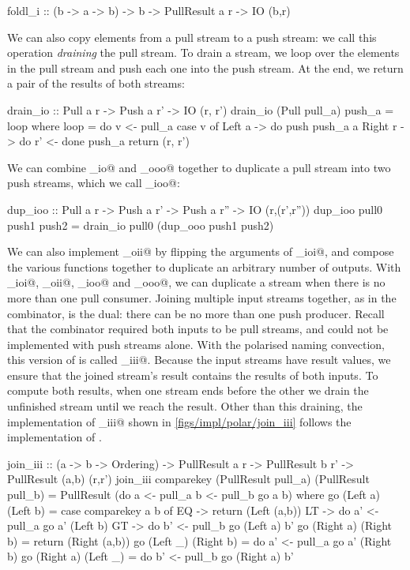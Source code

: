 \begin{haskell}
foldl_i :: (b -> a -> b) -> b -> PullResult a r -> IO (b,r)
\end{haskell}

We can also copy elements from a pull stream to a push stream: we call this operation \emph{draining} the pull stream.
To drain a stream, we loop over the elements in the pull stream and push each one into the push stream.
At the end, we return a pair of the results of both streams:

\begin{haskell}
drain_io :: Pull a r -> Push a r' -> IO (r, r')
drain_io (Pull pull_a) push_a = loop
 where
  loop = do
    v <- pull_a
    case v of
     Left a -> do
      push push_a a
     Right r -> do
      r' <- done push_a
      return (r, r')
\end{haskell}

We can combine \Hs@drain_io@ and \Hs@dup_ooo@ together to duplicate a pull stream into two push streams, which we call \Hs@dup_ioo@:

\begin{haskell}
dup_ioo :: Pull a r -> Push a r' -> Push a r'' -> IO (r,(r',r''))
dup_ioo pull0 push1 push2 = drain_io pull0 (dup_ooo push1 push2)
\end{haskell}

We can also implement \Hs@dup_oii@ by flipping the arguments of \Hs@dup_ioi@, and compose the various \Hs@dup@ functions together to duplicate an arbitrary number of outputs.
With \Hs@dup_ioi@, \Hs@dup_oii@, \Hs@dup_ioo@ and \Hs@dup_ooo@, we can duplicate a stream when there is no more than one pull consumer.
Joining multiple input streams together, as in the \Hs@join@ combinator, is the dual: there can be no more than one push producer.
Recall that the \Hs@join@ combinator required both inputs to be pull streams, and could not be implemented with push streams alone.
With the polarised naming convection, this version of \Hs@join@ is called \Hs@join_iii@.
Because the input streams have result values, we ensure that the joined stream's result contains the results of both inputs.
To compute both results, when one stream ends before the other we drain the unfinished stream until we reach the result.
Other than this draining, the implementation of \Hs@join_iii@ shown in \cref{figs/impl/polar/join_iii} follows the implementation of \Hs@join@.

\begin{haskell}[float,caption=Polarised implementation of \Hs/join_iii/,label=figs/impl/polar/join_iii]
join_iii :: (a -> b -> Ordering) -> PullResult a r
         -> PullResult b r'      -> PullResult (a,b) (r,r')
join_iii comparekey (PullResult pull_a) (PullResult pull_b) = PullResult (do
   a <- pull_a
   b <- pull_b
   go a b)
 where
  go (Left a) (Left b)
   = case comparekey a b of
      EQ -> return (Left (a,b))
      LT -> do
        a' <- pull_a
        go a' (Left b)
      GT -> do
        b' <- pull_b
        go (Left a) b'
  go (Right a) (Right b) = return (Right (a,b))
  go (Left _) (Right b) = do
    a' <- pull_a
    go a' (Right b)
  go (Right a) (Left _) = do
    b' <- pull_b
    go (Right a) b'
\end{haskell}

